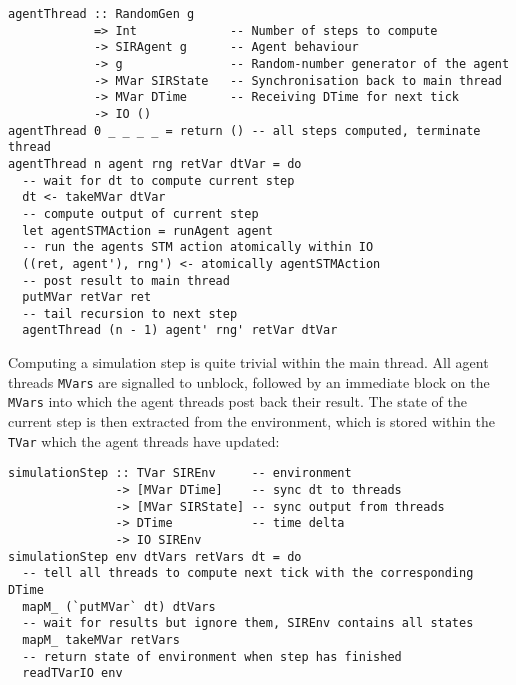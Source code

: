 \begin{footnotesize}
\begin{verbatim}
agentThread :: RandomGen g 
            => Int             -- Number of steps to compute
            -> SIRAgent g      -- Agent behaviour 
            -> g               -- Random-number generator of the agent
            -> MVar SIRState   -- Synchronisation back to main thread
            -> MVar DTime      -- Receiving DTime for next tick
            -> IO ()
agentThread 0 _ _ _ _ = return () -- all steps computed, terminate thread
agentThread n agent rng retVar dtVar = do
  -- wait for dt to compute current step
  dt <- takeMVar dtVar
  -- compute output of current step
  let agentSTMAction = runAgent agent
  -- run the agents STM action atomically within IO
  ((ret, agent'), rng') <- atomically agentSTMAction 
  -- post result to main thread
  putMVar retVar ret
  -- tail recursion to next step 
  agentThread (n - 1) agent' rng' retVar dtVar
\end{verbatim}
\end{footnotesize}

\medskip %

Computing a simulation step is quite trivial within the main thread. All agent threads \texttt{MVars} are signalled to unblock, followed by an immediate block on the \texttt{MVars} into which the agent threads post back their result. The state of the current step is then extracted from the environment, which is stored within the \texttt{TVar} which the agent threads have updated: \\ %

\begin{footnotesize}
\begin{verbatim}
simulationStep :: TVar SIREnv     -- environment 
               -> [MVar DTime]    -- sync dt to threads
               -> [MVar SIRState] -- sync output from threads
               -> DTime           -- time delta
               -> IO SIREnv
simulationStep env dtVars retVars dt = do
  -- tell all threads to compute next tick with the corresponding DTime
  mapM_ (`putMVar` dt) dtVars
  -- wait for results but ignore them, SIREnv contains all states
  mapM_ takeMVar retVars
  -- return state of environment when step has finished
  readTVarIO env
\end{verbatim}
\end{footnotesize}
